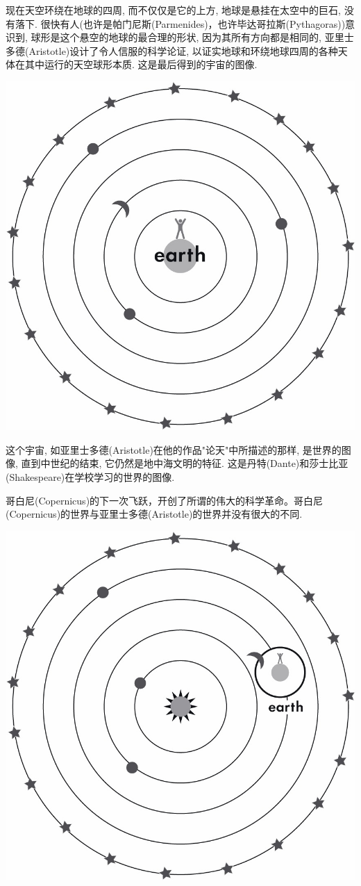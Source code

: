    现在天空环绕在地球的四周, 而不仅仅是它的上方, 地球是悬挂在太空中的巨石, 没有落下. 很快有人(也许是帕门尼斯(Parmenides)，也许毕达哥拉斯(Pythagoras))意识到, 球形是这个悬空的地球的最合理的形状, 因为其所有方向都是相同的, 亚里士多德(Aristotle)设计了令人信服的科学论证, 以证实地球和环绕地球四周的各种天体在其中运行的天空球形本质. 这是最后得到的宇宙的图像.

	\bc
	\includegraphics[width=.9\textwidth]{img/33.jpg}\\[12pt]
	\ec

   这个宇宙, 如亚里士多德(Aristotle)在他的作品"论天"中所描述的那样, 是世界的图像, 直到中世纪的结束, 它仍然是地中海文明的特征. 这是丹特(Dante)和莎士比亚(Shakespeare)在学校学习的世界的图像. 

   哥白尼(Copernicus)的下一次飞跃，开创了所谓的伟大的科学革命。哥白尼(Copernicus)的世界与亚里士多德(Aristotle)的世界并没有很大的不同.

	\bc
	\includegraphics[width=.9\textwidth]{img/34.jpg}\\[12pt]
	\ec

